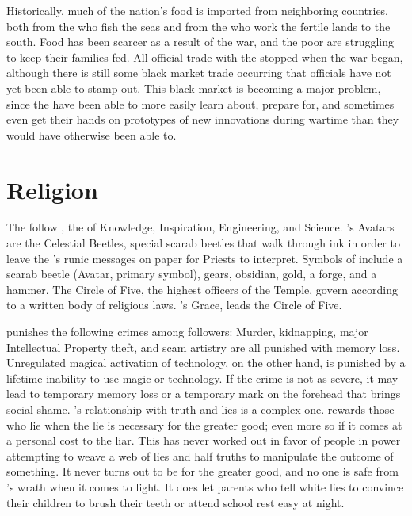 \documentclass[blue]{GL2020}
\begin{document}
Historically, much of the nation's food is imported from neighboring countries, both from the \pShippies{} who fish the seas and from the \pFarmers{} who work the fertile lands to the south. Food has been scarcer as a result of the war, and the poor are struggling to keep their families fed. All official trade with the \pShippies{} stopped when the war began, although there is still some black market trade occurring that officials have not yet been able to stamp out. This black market is becoming a major problem, since the \pShippies{} have been able to more easily learn about, prepare for, and sometimes even get their hands on prototypes of new \pTech{} innovations during wartime than they would have otherwise been able to.

\section*{Religion}
The \pTechies{} follow \cTechGod{}, the \cTechGod{\Deity} of Knowledge, Inspiration, Engineering, and Science. \cTechGod{}'s Avatars are the Celestial Beetles, special scarab beetles that walk through ink in order to leave the \cTechGod{\Deity}'s runic messages on paper for Priests to interpret. Symbols of \cTechGod{} include a scarab beetle (Avatar, primary symbol), gears, obsidian, gold, a forge, and a hammer. The Circle of Five, the highest officers of the Temple, govern according to a written body of religious laws. \cTechGod{}’s Grace, \cAntiChup{\full} leads the Circle of Five. 

\cTechGod{} punishes the following crimes among \cTechGod{\their} followers: Murder, kidnapping, major Intellectual Property theft, and scam artistry are all punished with memory loss. Unregulated magical activation of technology, on the other hand, is punished by a lifetime inability to use magic or technology. If the crime is not as severe, it may lead to temporary memory loss or a temporary mark on the forehead that brings social shame. \cTechGod{}’s relationship with truth and lies is a complex one. \cTechGod{} rewards those who lie when the lie is necessary for the greater good; even more so if it comes at a personal cost to the liar. This has never worked out in favor of people in power attempting to weave a web of lies and half truths to manipulate the outcome of something. It never turns out to be for the greater good, and no one is safe from \cTechGod{}’s wrath when it comes to light. It does let parents who tell white lies to convince their children to brush their teeth or attend school rest easy at night. 
\end{document}
